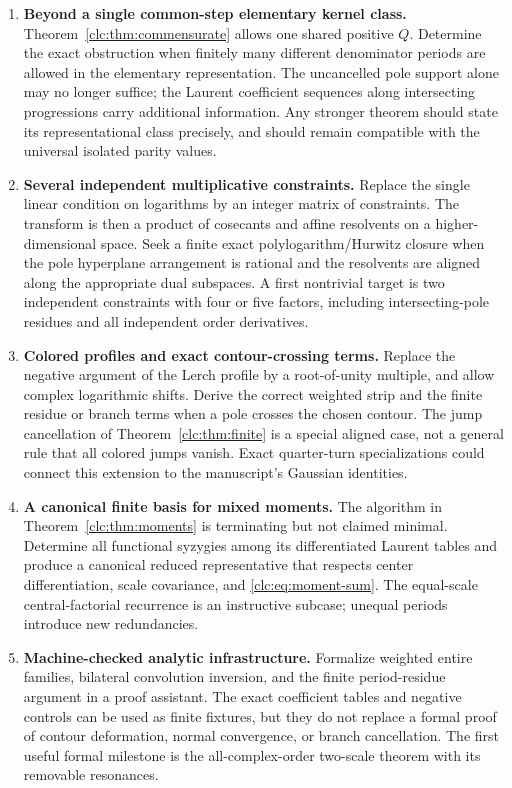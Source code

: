 \begin{enumerate}[label=\textbf{Q\arabic*.},leftmargin=2.8em,itemsep=9pt]
\item \textbf{Beyond a single common-step elementary kernel class.}
Theorem~\ref{clc:thm:commensurate} allows one shared positive $Q$.
Determine the exact obstruction when finitely many different denominator
periods are allowed in the elementary representation. The uncancelled
pole support alone may no longer suffice; the Laurent coefficient
sequences along intersecting progressions carry additional information.
Any stronger theorem should state its representational class precisely,
and should remain compatible with the universal isolated parity values.

\item \textbf{Several independent multiplicative constraints.}
Replace the single linear condition on logarithms by an integer matrix
of constraints. The transform is then a product of cosecants and affine
resolvents on a higher-dimensional space. Seek a finite exact
polylogarithm/Hurwitz closure when the pole hyperplane arrangement is
rational and the resolvents are aligned along the appropriate dual
subspaces. A first nontrivial target is two independent constraints
with four or five factors, including intersecting-pole residues and all
independent order derivatives.

\item \textbf{Colored profiles and exact contour-crossing terms.}
Replace the negative argument of the Lerch profile by a root-of-unity
multiple, and allow complex logarithmic shifts. Derive the correct
weighted strip and the finite residue or branch terms when a pole
crosses the chosen contour. The jump cancellation of
Theorem~\ref{clc:thm:finite} is a special aligned case, not a general
rule that all colored jumps vanish. Exact quarter-turn specializations
could connect this extension to the manuscript's Gaussian identities.

\item \textbf{A canonical finite basis for mixed moments.}
The algorithm in Theorem~\ref{clc:thm:moments} is terminating but not
claimed minimal. Determine all functional syzygies among its differentiated
Laurent tables and produce a canonical reduced representative that
respects center differentiation, scale covariance, and
\eqref{clc:eq:moment-sum}. The equal-scale central-factorial recurrence
is an instructive subcase; unequal periods introduce new redundancies.

\item \textbf{Machine-checked analytic infrastructure.}
Formalize weighted entire families, bilateral convolution inversion,
and the finite period-residue argument in a proof assistant. The exact
coefficient tables and negative controls can be used as finite fixtures,
but they do not replace a formal proof of contour deformation, normal
convergence, or branch cancellation. The first useful formal milestone
is the all-complex-order two-scale theorem with its removable resonances.
\end{enumerate}

